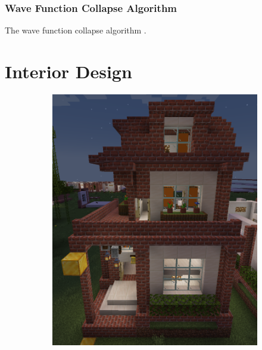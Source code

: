 \documentclass[
oneside,
fontsize=11pt
]{scrartcl}
\begin{document}
\subsubsection{Wave Function Collapse Algorithm}
The wave function collapse algorithm \cite{WFC_GitHub}.




\section{Interior Design}

\begin{figure}[ht]
  \centering
  \begin{subfigure}[t]{0.3\textwidth}
    \includegraphics[width=\textwidth]{images/interior/entrance-decoration.png}
  \end{subfigure}
  \hfill
  \begin{subfigure}[t]{0.3\textwidth}

\end{subfigure}
\end{figure}
\end{document}
